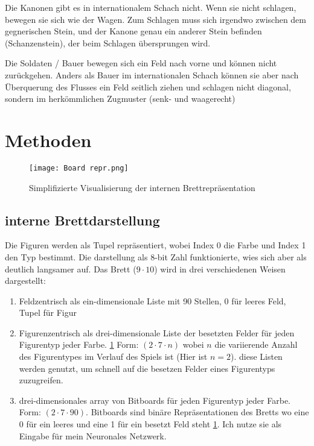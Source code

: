 \documentclass{jpp}
\begin{document}
 Die Kanonen gibt es in internationalem Schach nicht. Wenn sie nicht schlagen, bewegen sie sich wie der Wagen. Zum Schlagen muss sich irgendwo zwischen dem gegnerischen Stein, und der Kanone genau ein anderer Stein befinden (Schanzenstein), der beim Schlagen übersprungen wird.
 
 Die Soldaten / Bauer bewegen sich ein Feld nach vorne und können nicht zurückgehen. Anders als Bauer im internationalen Schach können sie aber nach Überquerung des Flusses ein Feld seitlich ziehen und schlagen nicht diagonal, sondern im herkömmlichen Zugmuster (senk- und waagerecht)
 
\section{Methoden}
\begin{figure}
    \centering
    \texttt{[image: Board repr.png]}
    \caption{Simplifizierte Visualisierung der internen Brettrepräsentation}
    \label{fig:repr}
\end{figure}
\subsection{interne Brettdarstellung}
Die Figuren werden als Tupel repräsentiert, wobei Index 0 die Farbe und Index 1 den Typ bestimmt. Die darstellung als 8-bit Zahl funktionierte, wies sich aber als deutlich langsamer auf. Das Brett ($9\cdot10$) wird in drei verschiedenen Weisen dargestellt:

\begin{enumerate}
\item Feldzentrisch als ein-dimensionale Liste mit 90 Stellen, 0 für leeres Feld, Tupel für Figur
\item Figurenzentrisch als drei-dimensionale Liste der besetzten Felder für jeden Figurentyp jeder Farbe. \ref{fig:repr} Form: $(2 \cdot 7 \cdot n)$ wobei $n$ die variierende Anzahl des Figurentypes im Verlauf des Spiels ist (Hier ist $n = 2$). diese Listen werden genutzt, um schnell auf die besetzen Felder eines Figurentyps zuzugreifen.
\item drei-dimensionales array von Bitboards für jeden Figurentyp jeder Farbe. Form: $(2\cdot7\cdot90)$. Bitboards sind binäre Repräsentationen des Bretts wo eine 0 für ein leeres und eine 1 für ein besetzt Feld steht \ref{fig:repr}. Ich nutze sie als Eingabe für mein Neuronales Netzwerk.
\end{enumerate}
\end{document}
